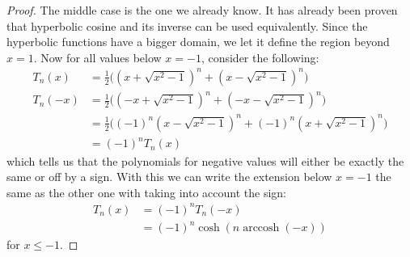 \documentclass[12pt, letterpaper, onecolumn, conference, final]{IEEEtran}
\theoremstyle{definition}
\newtheorem{proposition}{Proposition}
\theoremstyle{plain}
\DeclareMathOperator{\arccosh}{arccosh}
\begin{document}
\begin{proof}
The middle case is the one we already know. It has already been proven that hyperbolic cosine and its inverse can be used equivalently. Since the hyperbolic functions have a bigger domain, we let it define the region beyond $x = 1$. Now for all values below $x = -1$, consider the following:
\begin{equation*}
\begin{split}
T_n(x) &= \frac{1}{2} \Big( (x + \sqrt{x^2 - 1})^n + (x - \sqrt{x^2 - 1})^n \Big) \\
T_n(-x) &= \frac{1}{2} \Big( (-x + \sqrt{x^2 - 1})^n + (-x - \sqrt{x^2 - 1})^n \Big) \\
&= \frac{1}{2} \Big( (-1)^n(x - \sqrt{x^2 - 1})^n + (-1)^n(x + \sqrt{x^2 - 1})^n \Big) \\
&= (-1)^nT_n(x)
\end{split}
\end{equation*}
which tells us that the polynomials for negative values will either be exactly the same or off by a sign. With this we can write the extension below $x = -1$ the same as the other one with taking into account the sign:
\begin{equation*}
\begin{split}
T_n(x) &= (-1)^nT_n(-x) \\
&= (-1)^n\cosh(n\arccosh(-x))
\end{split}
\end{equation*}
for $x \leq -1$.
\end{proof}

\begin{center}
\end{center}
\end{document}
